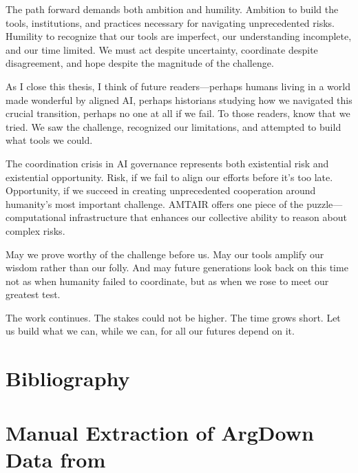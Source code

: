 \documentclass[
  11pt,
  letterpaper,
  openany]{book}
\let\cleardoublepage\clearpage
\begin{document}
The path forward demands both ambition and humility. Ambition to build
the tools, institutions, and practices necessary for navigating
unprecedented risks. Humility to recognize that our tools are imperfect,
our understanding incomplete, and our time limited. We must act despite
uncertainty, coordinate despite disagreement, and hope despite the
magnitude of the challenge.

As I close this thesis, I think of future readers---perhaps humans
living in a world made wonderful by aligned AI, perhaps historians
studying how we navigated this crucial transition, perhaps no one at all
if we fail. To those readers, know that we tried. We saw the challenge,
recognized our limitations, and attempted to build what tools we could.

The coordination crisis in AI governance represents both existential
risk and existential opportunity. Risk, if we fail to align our efforts
before it's too late. Opportunity, if we succeed in creating
unprecedented cooperation around humanity's most important challenge.
AMTAIR offers one piece of the puzzle---computational infrastructure
that enhances our collective ability to reason about complex risks.

May we prove worthy of the challenge before us. May our tools amplify
our wisdom rather than our folly. And may future generations look back
on this time not as when humanity failed to coordinate, but as when we
rose to meet our greatest test.

The work continues. The stakes could not be higher. The time grows
short. Let us build what we can, while we can, for all our futures
depend on it.


\chapter*{Bibliography}\label{bibliography}


\printbibliography[heading=none]

\cleardoublepage
{}
{}
\appendix

\chapter{\texorpdfstring{Manual Extraction of ArgDown Data from
\textcite{bucknall2022}}{Manual Extraction of ArgDown Data from @bucknall2022}}\label{sec-bucknall2022}
\end{document}
